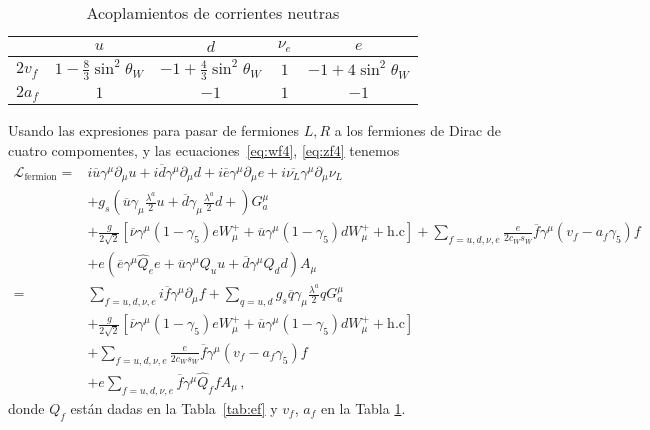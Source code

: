 \begin{table}  %
  \centering %
  \begin{tabular}{l|c|c|c|c} %
   &$u$&$d$&$\nu_e$&$e$\\\hline{}
$2v_f$&$1-\frac{8}{3}\sin^2\theta_W$&$-1+\frac{4}{3}\sin^2\theta_W$&$1$&$-1+4\sin^2\theta_W$\\
$2a_f$&$1$&$-1$&$1$&$-1$\\
  \end{tabular} %
  \caption{Acoplamientos de corrientes neutras} %
\label{tab:zcoup}
\end{table} %


Usando las expresiones para pasar de fermiones $L,R$ a los fermiones de Dirac de cuatro compomentes, y las ecuaciones~\eqref{eq:wf4}, \eqref{eq:zf4} tenemos
\begin{align}
\label{eq:lfermionfin}
   \mathcal{L}_{\text{fermion}}
  =&i\overline{u}\gamma^\mu\partial_\mu u+i\overline{d}\gamma^\mu\partial_\mu d+i\overline{e}\gamma^\mu{\partial}_\mu e
+i\overline{\nu_L}\gamma^\mu{\partial}_\mu \nu_L\nonumber\\
&+g_s \left(\overline{u}\gamma_\mu\frac{\lambda^a}{2}u
+\overline{d}\gamma_\mu\frac{\lambda^a}{2}d+ \right)G^\mu_a\nonumber\\
&+\frac{g}{2\sqrt{2}}\left[\overline{\nu}\gamma^\mu(1-\gamma_5)eW_\mu^++
\overline{u}\gamma^\mu(1-\gamma_5)d W_\mu^++\text{h.c}\right]
+\sum_{f=u,d,\nu,e}\frac{e}{2c_W s_W}\overline{f}\gamma^\mu\left(v_f-a_f\gamma_5\right)f\nonumber\\
&+e\left(\overline{e}\gamma^\mu \widehat{Q}_e e+
\overline{u}\gamma^\mu {Q}_u u+
\overline{d}\gamma^\mu {Q}_d d\right) A_\mu\nonumber\\
    =&\sum_{f=u,d,\nu,e}i\overline{f}\gamma^\mu\partial_\mu f+\sum_{q=u,d}g_s\overline{q}\gamma_\mu\frac{\lambda^a}{2}qG^\mu_a\nonumber\\
&+\frac{g}{2\sqrt{2}}\left[\overline{\nu}\gamma^\mu(1-\gamma_5)eW_\mu^++
\overline{u}\gamma^\mu(1-\gamma_5)d W_\mu^++\text{h.c}\right]\nonumber\\
&+\sum_{f=u,d,\nu,e}\frac{e}{2c_W s_W}\overline{f}\gamma^\mu\left(v_f-a_f\gamma_5\right)f\nonumber\\
&+e\sum_{f=u,d,\nu,e}\overline{f}\gamma^\mu \widehat{Q}_f f A_\mu\,,
\end{align}
donde $Q_f$ están dadas en la Tabla~\ref{tab:ef} y $v_f$, $a_f$ en la Tabla \ref{tab:zcoup}.




